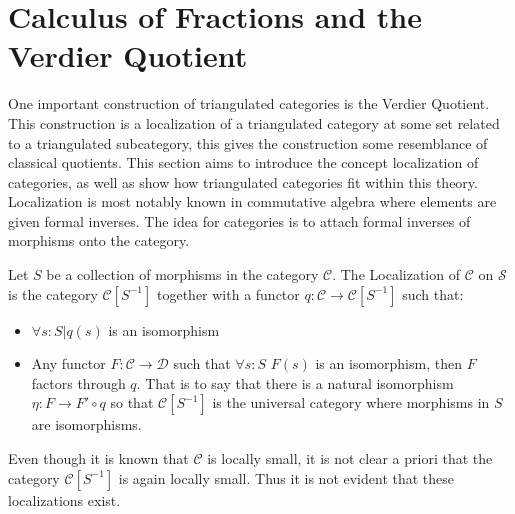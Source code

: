 \section{Calculus of Fractions and the Verdier Quotient}
    One important construction of triangulated categories is the Verdier Quotient. This construction is a localization of a triangulated category at some set related to a triangulated subcategory, this gives the construction some resemblance of classical quotients. This section aims to introduce the concept localization of categories, as well as show how triangulated categories fit within this theory. Localization is most notably known in commutative algebra where elements are given formal inverses. The idea for categories is to attach formal inverses of morphisms onto the category.
    \begin{definition}
        Let $S$ be a collection of morphisms in the category $\mathcal{C}$. The Localization of $\mathcal{C}$ on $\mathcal{S}$ is the category $\mathcal{C}[S^{-1}]$ together with a functor $q:\mathcal{C}\rightarrow \mathcal{C}[S^{-1}]$ such that:
        \begin{itemize}
            \item $\forall s:S|q(s)$ is an isomorphism
            \item Any functor $F:\mathcal{C}\rightarrow\mathcal{D}$ such that $\forall s:S$ $F(s)$ is an isomorphism, then $F$ factors through $q$. That is to say that there is a natural isomorphism $\eta : F\rightarrow F'\circ q$ so that $\mathcal{C}[S^{-1}]$ is the universal category where morphisms in $S$ are isomorphisms.
        \end{itemize}
        \begin{center}
        \end{center}
    \end{definition}

    \begin{remark}
        Even though it is known that $\mathcal{C}$ is locally small, it is not clear a priori that the category $\mathcal{C}[S^{-1}]$ is again locally small. Thus it is not evident that these localizations exist.
    \end{remark}

